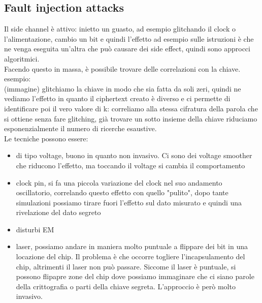 \documentclass[oneside, 12pt]{extbook}
\begin{document}
\subsection{Fault injection attacks}
Il side channel è attivo: inietto un guasto, ad esempio glitchando il clock o l'alimentazione, cambio un bit e quindi l'effetto ad esempio sulle istruzioni è che ne venga eseguita un'altra che può causare dei side effect, quindi sono approcci algoritmici.\\Facendo questo in massa, è possibile trovare delle correlazioni con la chiave.\\esempio:\\ (immagine) glitchiamo la chiave in modo che sia fatta da soli zeri, quindi ne vediamo l'effetto in quanto il ciphertext creato è diverso e ci permette di identificare poi il vero valore di k: correliamo alla stessa cifratura della parola che si ottiene senza fare glitching, già trovare un sotto insieme della chiave riduciamo esponenzialmente il numero di ricerche esaustive.\\Le tecniche possono essere:
\begin{itemize}
	\item di tipo voltage, buono in quanto non invasivo. Ci sono dei voltage smoother che riducono l'effetto, ma toccando il voltage si cambia il comportamento
	\item clock pin, si fa una piccola variazione del clock nel suo andamento oscillatorio, correlando questo effetto con quello "pulito", dopo tante simulazioni possiamo tirare fuori l'effetto sul dato misurato e quindi una rivelazione del dato segreto
	\item disturbi EM
	\item laser, possiamo andare in maniera molto puntuale a flippare dei bit in una locazione del chip. Il problema è che occorre togliere l'incapsulamento del chip, altrimenti il laser non può passare. Siccome il laser è puntuale, si possono flipapre zone del chip dove possiamo immaginare che ci siano parole della crittografia o parti della chiave segreta. L'approccio è però molto invasivo.
\end{itemize}
\end{document}
